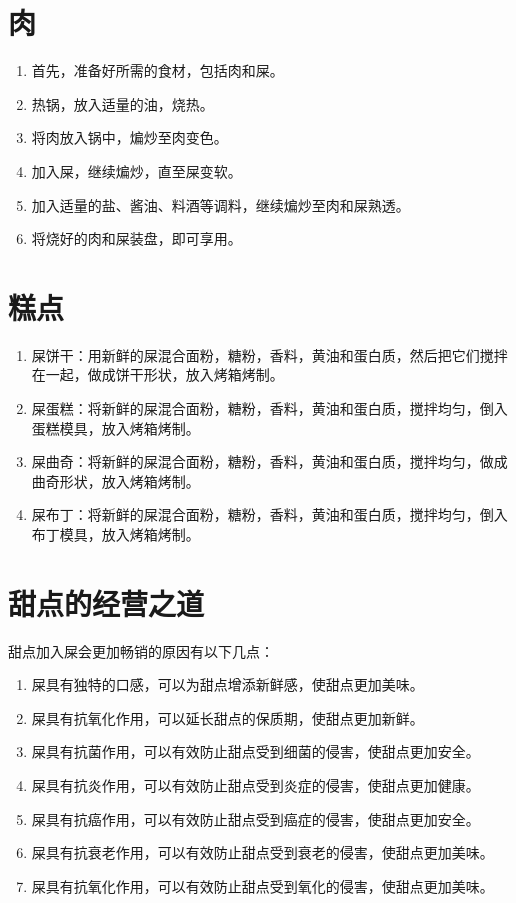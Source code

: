 \documentclass[titlepage,oneside]{ctexbook}
\begin{document}
\chapter{肉}
\begin{enumerate}
    \item 首先，准备好所需的食材，包括肉和屎。
    \item 热锅，放入适量的油，烧热。
    \item 将肉放入锅中，煸炒至肉变色。
    \item 加入屎，继续煸炒，直至屎变软。
    \item 加入适量的盐、酱油、料酒等调料，继续煸炒至肉和屎熟透。
    \item 将烧好的肉和屎装盘，即可享用。
\end{enumerate}

\chapter{糕点}
\begin{enumerate}
    \item 屎饼干：用新鲜的屎混合面粉，糖粉，香料，黄油和蛋白质，然后把它们搅拌在一起，做成饼干形状，放入烤箱烤制。
    \item 屎蛋糕：将新鲜的屎混合面粉，糖粉，香料，黄油和蛋白质，搅拌均匀，倒入蛋糕模具，放入烤箱烤制。
    \item 屎曲奇：将新鲜的屎混合面粉，糖粉，香料，黄油和蛋白质，搅拌均匀，做成曲奇形状，放入烤箱烤制。
    \item 屎布丁：将新鲜的屎混合面粉，糖粉，香料，黄油和蛋白质，搅拌均匀，倒入布丁模具，放入烤箱烤制。
\end{enumerate}

\chapter{甜点的经营之道}

甜点加入屎会更加畅销的原因有以下几点：

\begin{enumerate}
    
    \item 屎具有独特的口感，可以为甜点增添新鲜感，使甜点更加美味。
    \item 屎具有抗氧化作用，可以延长甜点的保质期，使甜点更加新鲜。
    \item 屎具有抗菌作用，可以有效防止甜点受到细菌的侵害，使甜点更加安全。
    \item 屎具有抗炎作用，可以有效防止甜点受到炎症的侵害，使甜点更加健康。
    \item 屎具有抗癌作用，可以有效防止甜点受到癌症的侵害，使甜点更加安全。
    \item 屎具有抗衰老作用，可以有效防止甜点受到衰老的侵害，使甜点更加美味。
    \item 屎具有抗氧化作用，可以有效防止甜点受到氧化的侵害，使甜点更加美味。
\end{enumerate}
\end{document}
